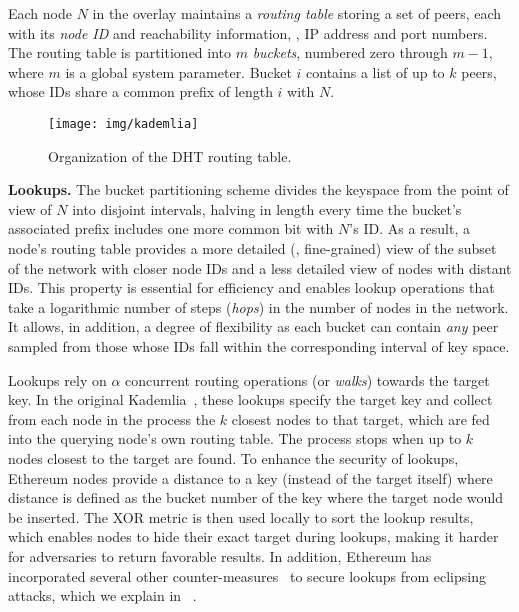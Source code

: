 Each node $N$ in the overlay maintains a \emph{routing table} storing a set of peers, each with its \emph{node ID} and reachability information, \ie, IP address and port numbers.
The routing table is partitioned into $m$ \textit{buckets}, numbered zero through $m-1$, where $m$ is a global system parameter.
Bucket $i$ contains a list of up to $k$ peers, whose IDs share a common prefix of length $i$ with $N$.


\begin{figure}
    \texttt{[image: img/kademlia]}
    \caption{Organization of the DHT routing table.}
    \label{fig:kademlia}
 \end{figure}

\smallskip
\noindent
\textbf{Lookups.}
%
The bucket partitioning scheme divides the keyspace from the point of view of $N$ into disjoint intervals, halving in length every time the bucket's associated prefix includes one more common bit with $N$'s ID.
As a result, a node's routing table provides a more detailed (\ie, fine-grained) view of the subset of the network with closer node IDs and a less detailed view of nodes with distant IDs.
This property is essential for efficiency and enables lookup operations that take a logarithmic number of steps (\emph{hops}) in the number of nodes in the network.
It allows, in addition, a degree of flexibility as each bucket can contain \textit{any} peer sampled from those whose IDs fall within the corresponding interval of key space.

Lookups rely on $\alpha$ concurrent routing operations (or \emph{walks}) towards the target key.
In the original Kademlia~\cite{maymounkov2002kademlia}, these lookups specify the target key and collect from each node in the process the $k$ closest nodes to that target, which are fed into the querying node's own routing table.
The process stops when up to $k$ nodes closest to the target are found. %
To enhance the security of lookups, Ethereum nodes provide a distance to a key (instead of the target itself) where distance is defined as the bucket number of the key where 
the target node would be inserted. The XOR metric is then used locally to sort the lookup results, which enables nodes to hide their exact target during lookups, making it harder for adversaries to return favorable results. 
In addition, Ethereum has incorporated several other counter-measures~\cite{marcus2018low, henningsen2019eclipsing} to secure lookups from eclipsing attacks, which we explain in ~. 


